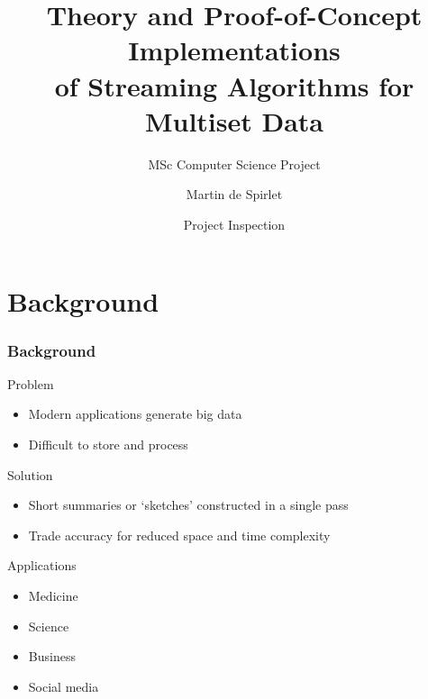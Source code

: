 \documentclass{beamer}
\title[Streaming Algorithms]{Theory and Proof-of-Concept Implementations \\ of Streaming Algorithms for Multiset Data}
\subtitle{MSc Computer Science Project}
\author{Martin de Spirlet}
\institute[]{University of Birmingham}
\date{Project Inspection}
\begin{document}
\begin{frame}
  \titlepage
\end{frame}

\section{Background}

\begin{frame}
  \frametitle{Background}

  \begin{block}{Problem}
    \begin{itemize}
      \item Modern applications generate big data
      \item Difficult to store and process
    \end{itemize}
  \end{block}

  \begin{block}{Solution}
    \begin{itemize}
      \item Short summaries or `sketches' constructed in a single pass
      \item Trade accuracy for reduced space and time complexity
    \end{itemize}
  \end{block}

  \begin{block}{Applications}
    \begin{itemize}
      \item Medicine
      \item Science
      \item Business
      \item Social media
    \end{itemize}
  \end{block}
\end{frame}
\end{document}
